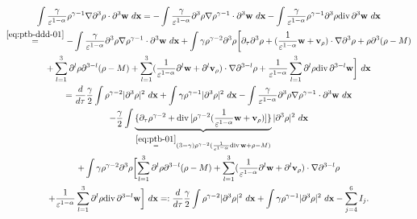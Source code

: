 \documentclass[11pt]{article}
\theoremstyle{plain}
\theoremstyle{definition}
\theoremstyle{remark}
\newcommand{\dtau}{\partial_\tau}
\newcommand{\dv}{\mathrm{div}\, }
\renewcommand{\vec}[1]{{\bf #1}}
\newcommand{\idx}{\ d\vec x}
\numberwithin{equation}{section}
\begin{document}
\begin{equation}
    \label{est:102}
    \begin{gathered}
        \int \frac{\gamma}{\varepsilon^{1-\alpha}}  \rho^{\gamma-1} \nabla \partial^3 \rho \cdot \partial^3 \vec w \idx = - \int \frac{\gamma}{\varepsilon^{1-\alpha }} \partial^3 \rho \nabla \rho^{\gamma-1} \cdot \partial^3 \vec w \idx - \int \frac{\gamma}{\varepsilon^{1-\alpha}} \rho^{\gamma-1} \partial^3 \rho  \dv \partial^3 \vec w \idx \\
        \stackrel{\eqref{eq:ptb-ddd-01}}{=} - \int \frac{\gamma}{\varepsilon^{1-\alpha }} \partial^3 \rho \nabla \rho^{\gamma-1} \cdot \partial^3 \vec w \idx + \int \gamma \rho^{\gamma-2} \partial^3 \rho \biggl\lbrack \dtau \partial^3 \rho + (\frac{1}{\varepsilon^{1-\alpha}}\vec w + \vec v_\rho) \cdot\nabla \partial^3 \rho  + \rho \partial^3(\rho - M) \\
        + \sum_{l=1}^3 \partial^l \rho \partial^{3-l}(\rho - M) + \sum_{l=1}^3 (\frac{1}{\varepsilon^{1-\alpha}} \partial^l \vec w + \partial^l \vec v_\rho) \cdot \nabla \partial^{3-l} \rho + \frac{1}{\varepsilon^{1-\alpha}}\sum_{l=1}^3 \partial^l \rho \dv \partial^{3-l}\vec w \biggr\rbrack \idx \\
        = \dfrac{d}{d\tau} \frac{\gamma}{2} \int \rho^{\gamma-2} \vert \partial^3 \rho \vert^2 \idx  + \int \gamma \rho^{\gamma-1} \vert \partial^3 \rho \vert^2 \idx - \int \frac{\gamma}{\varepsilon^{1-\alpha }} \partial^3 \rho \nabla \rho^{\gamma-1} \cdot \partial^3 \vec w \idx  \\
        - \frac{\gamma}{2} \int \underbrace{\lbrace \dtau \rho^{\gamma-2} + \dv \lbrack \rho^{\gamma-2} (\frac{1}{\varepsilon^{1-\alpha}} \vec w + \vec v_\rho)\rbrack \rbrace}_{\stackrel{\eqref{eq:ptb-01}}{=} (3-\gamma) \rho^{\gamma-2}  (\frac{1}{\varepsilon^{1-\alpha}}\dv \vec w + \rho - M)} \vert \partial^3 \rho \vert^2 \idx \\
        + \int \gamma\rho^{\gamma-2} \partial^3 \rho \biggl\lbrack \sum_{l=1}^3 \partial^l \rho \partial^{3-l}(\rho - M) + \sum_{l=1}^3 (\frac{1}{\varepsilon^{1-\alpha}} \partial^l \vec w + \partial^l \vec v_\rho) \cdot \nabla \partial^{3-l} \rho \\
        + \frac{1}{\varepsilon^{1-\alpha}}\sum_{l=1}^3 \partial^l \rho \dv \partial^{3-l}\vec w \biggr\rbrack \idx =:\dfrac{d}{d\tau} \frac{\gamma}{2} \int \rho^{\gamma-2} \vert \partial^3 \rho \vert^2 \idx  + \int \gamma \rho^{\gamma-1} \vert \partial^3 \rho \vert^2 \idx - \sum_{j=4}^{6} I_{j}.
    \end{gathered}
\end{equation}
\end{document}
